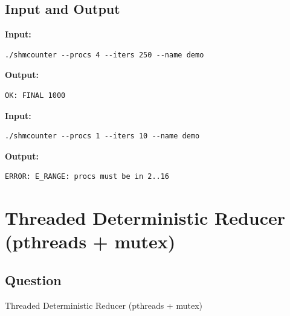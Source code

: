 \documentclass[12pt,a4paper]{article}
\begin{document}
\subsection{Input and Output}
\noindent\textbf{Input:}
\begin{verbatim}
./shmcounter --procs 4 --iters 250 --name demo
\end{verbatim}
\vspace{0.5cm}
\noindent\textbf{Output:}
\begin{verbatim}
OK: FINAL 1000
\end{verbatim}

\noindent\textbf{Input:}
\begin{verbatim}
./shmcounter --procs 1 --iters 10 --name demo 
\end{verbatim}
\vspace{0.5cm}
\noindent\textbf{Output:}
\begin{verbatim}
ERROR: E_RANGE: procs must be in 2..16

\end{verbatim}
\newpage
\section{Threaded Deterministic Reducer (pthreads + mutex)}
\subsection{Question}
Threaded Deterministic Reducer (pthreads + mutex)
\end{document}
